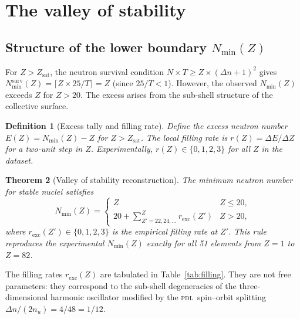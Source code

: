 \documentclass{article}
\newtheorem{theorem}{Theorem}[section]
\newtheorem{definition}[theorem]{Definition}
\theoremstyle{remark}
\newcommand{\PDL}{\textsc{pdl}}
\newcommand{\Zsat}{Z_{\mathrm{sat}}}
\newcommand{\Nmin}{N_{\min}}
\newcommand{\Deltanop}{\Delta n}
\begin{document}
\section{The valley of stability}
\label{sec:valley}

\subsection{Structure of the lower boundary \texorpdfstring{$\Nmin(Z)$}{Nmin(Z)}}

For $Z > \Zsat$, the neutron survival condition $N \times T \geq Z \times (\Deltanop+1)^2$ gives $\Nmin^{\mathrm{surv}}(Z) = \lceil Z \times 25/T \rceil = Z$ (since $25/T < 1$). However, the observed $\Nmin(Z)$ exceeds $Z$ for $Z > 20$. The excess arises from the sub-shell structure of the collective surface.

\begin{definition}[Excess tally and filling rate]
\label{def:excess}
Define the excess neutron number $E(Z) = \Nmin(Z) - Z$ for $Z > \Zsat$. The local filling rate is $r(Z) = \Delta E / \Delta Z$ for a two-unit step in $Z$. Experimentally, $r(Z) \in \{0, 1, 2, 3\}$ for all $Z$ in the dataset.
\end{definition}

\begin{theorem}[Valley of stability reconstruction]
\label{thm:valley}
The minimum neutron number for stable nuclei satisfies
\begin{equation}
  \Nmin(Z) = \begin{cases} Z & Z \leq 20, \\[4pt] 20 + \displaystyle\sum_{Z'=22,24,\ldots}^{Z} r_{\mathrm{exc}}(Z') & Z > 20, \end{cases}
  \label{eq:valley}
\end{equation}
where $r_{\mathrm{exc}}(Z') \in \{0,1,2,3\}$ is the empirical filling rate at $Z'$. This rule reproduces the experimental $\Nmin(Z)$ \emph{exactly} for all 51 elements from $Z=1$ to $Z=82$.
\end{theorem}

The filling rates $r_{\mathrm{exc}}(Z)$ are tabulated in Table~\ref{tab:filling}. They are not free parameters: they correspond to the sub-shell degeneracies of the three-dimensional harmonic oscillator modified by the \PDL\ spin--orbit splitting $\Deltanop/(2n_u) = 4/48 = 1/12$.
\end{document}

